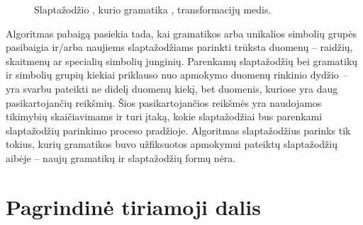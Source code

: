\documentclass{VUMIFInfBakalaurinis}
\begin{document}
\begin{figure}
  \caption{%
    Slaptažodžio , kurio gramatika ,
    transformacijų medis.
  }
  \label{plot:pcfgtransforms}
\end{figure}

Algoritmas pabaigą pasiekia tada, kai gramatikos arba unikalios simbolių grupės 
pasibaigia ir/arba naujiems slaptažodžiams parinkti trūksta duomenų -- raidžių, 
skaitmenų ar specialių simbolių junginių. Parenkamų slaptažodžių bei gramatikų 
ir simbolių grupių kiekiai priklauso nuo apmokymo duomenų rinkinio dydžio -- yra 
svarbu pateikti ne didelį duomenų kiekį, bet duomenis, kuriose yra daug 
pasikartojančių reikšmių. Šios pasikartojančios reikšmės yra naudojamos 
tikimybių skaičiavimams ir turi įtaką, kokie slaptažodžiai bus parenkami 
slaptažodžių parinkimo proceso pradžioje.
Algoritmas slaptažodžius parinks tik tokius, kurių gramatikos buvo užfiksuotos 
apmokymui pateiktų slaptažodžių aibėje -- naujų gramatikų ir slaptažodžių formų 
nėra.

\section{Pagrindinė tiriamoji dalis}
\end{document}
